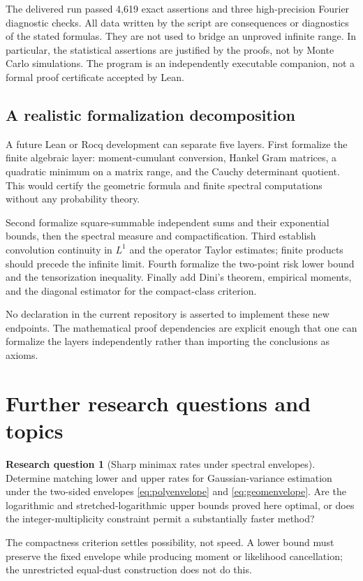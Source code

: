 \documentclass[11pt,letterpaper]{article}
\numberwithin{equation}{section}
\theoremstyle{definition}
\newtheorem{question}{Research question}
\theoremstyle{remark}
\begin{document}
The delivered run passed 4,619 exact assertions and three high-precision
Fourier diagnostic checks. All data written by the script are consequences or diagnostics of the stated
formulas. They are not used to bridge an unproved infinite range. In
particular, the statistical assertions are justified by the proofs, not by
Monte Carlo simulations. The program is an independently executable
companion, not a formal proof certificate accepted by Lean.

\subsection{A realistic formalization decomposition}
A future Lean or Rocq development can separate five layers.
First formalize the finite algebraic layer: moment-cumulant conversion,
Hankel Gram matrices, a quadratic minimum on a matrix range, and the Cauchy
determinant quotient. This would certify the geometric formula and finite
spectral computations without any probability theory.

Second formalize square-summable independent sums and their exponential
bounds, then the spectral measure and compactification. Third establish
convolution continuity in $L^1$ and the operator Taylor estimates; finite
products should precede the infinite limit. Fourth formalize the two-point
risk lower bound and the tensorization inequality. Finally add Dini's theorem,
empirical moments, and the diagonal estimator for the compact-class criterion.

No declaration in the current repository is asserted to implement these new
endpoints. The mathematical proof dependencies are explicit enough that one
can formalize the layers independently rather than importing the conclusions
as axioms.

\section{Further research questions and topics}
\label{sec:questions}

\begin{question}[Sharp minimax rates under spectral envelopes]
Determine matching lower and upper rates for Gaussian-variance estimation
under the two-sided envelopes \eqref{eq:polyenvelope} and
\eqref{eq:geomenvelope}. Are the logarithmic and stretched-logarithmic upper
bounds proved here optimal, or does the integer-multiplicity constraint
permit a substantially faster method?
\end{question}
The compactness criterion settles possibility, not speed. A lower bound must
preserve the fixed envelope while producing moment or likelihood cancellation;
the unrestricted equal-dust construction does not do this.
\end{document}
